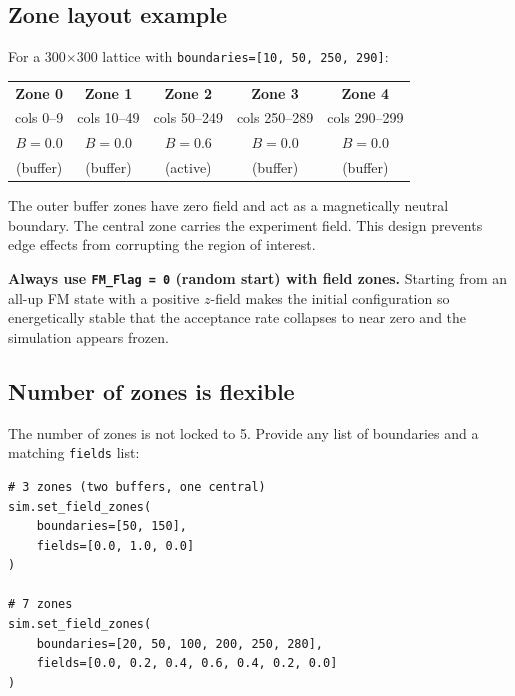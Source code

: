 \documentclass[12pt,a4paper]{article}
\newcommand{\code}[1]{\texttt{#1}}
\begin{document}
\subsection{Zone layout example}

For a 300$\times$300 lattice with \code{boundaries=[10, 50, 250, 290]}:

\begin{center}
\begin{tabular}{|c|c|c|c|c|}
\hline
\textbf{Zone 0} & \textbf{Zone 1} & \textbf{Zone 2} & \textbf{Zone 3} & \textbf{Zone 4} \\
cols 0--9 & cols 10--49 & cols 50--249 & cols 250--289 & cols 290--299 \\
$B = 0.0$ & $B = 0.0$ & $B = 0.6$ & $B = 0.0$ & $B = 0.0$ \\
(buffer) & (buffer) & (active) & (buffer) & (buffer) \\
\hline
\end{tabular}
\end{center}

The outer buffer zones have zero field and act as a magnetically neutral
boundary. The central zone carries the experiment field. This design prevents
edge effects from corrupting the region of interest.

\begin{warnbox}
\textbf{Always use \code{FM\_Flag = 0} (random start) with field zones.}
Starting from an all-up FM state with a positive $z$-field makes the initial
configuration so energetically stable that the acceptance rate collapses to
near zero and the simulation appears frozen.
\end{warnbox}

\subsection{Number of zones is flexible}

The number of zones is not locked to 5. Provide any list of boundaries and a
matching \code{fields} list:

\begin{lstlisting}[style=python]
# 3 zones (two buffers, one central)
sim.set_field_zones(
    boundaries=[50, 150],
    fields=[0.0, 1.0, 0.0]
)

# 7 zones
sim.set_field_zones(
    boundaries=[20, 50, 100, 200, 250, 280],
    fields=[0.0, 0.2, 0.4, 0.6, 0.4, 0.2, 0.0]
)
\end{lstlisting}

\end{document}
